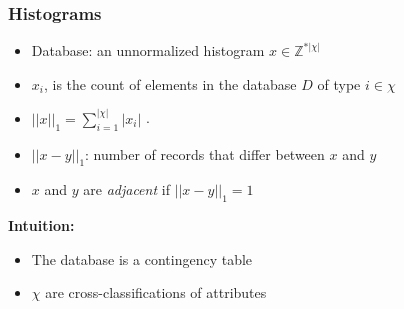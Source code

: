 \begin{frame}[allowframebreaks]%
\frametitle{Histograms}
\begin{itemize}
	\item Database: an unnormalized histogram $x\in \mathbb{Z}^{\ast |\chi |}$
	\item $x_{i}$, is the count of elements in the database $D$ of type $i\in \chi $
	\item $||x||_{1}=\sum_{i=1}^{|\chi |}\left\vert x_{i}\right\vert$ .
	\item $||{x}-{y}||_{1}$: number of records that differ between ${x}$ and ${y}$
	\item $x$ and $y$ are \textit{adjacent} if $||{x}-{y}||_{1}=1$ \vspace*{.25in}
\end{itemize}

\textbf{Intuition:}
\begin{itemize}
	\item The database is a contingency table
	\item $\chi$ are cross-classifications of attributes


\end{itemize}


\end{frame}%
%

